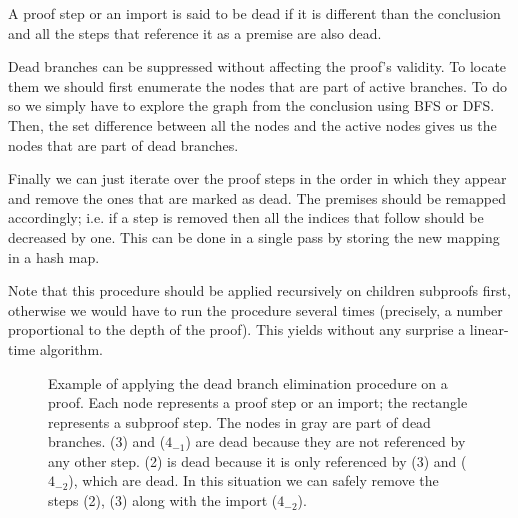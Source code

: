 \begin{definition}
A proof step or an import is said to be dead if it is different than the conclusion and all the steps that reference it as a premise are also dead.
\end{definition}

Dead branches can be suppressed without affecting the proof's validity. To locate them we should first enumerate the nodes that are part of active branches. To do so we simply have to explore the graph from the conclusion using BFS or DFS. Then, the set difference between all the nodes and the active nodes gives us the nodes that are part of dead branches.

Finally we can just iterate over the proof steps in the order in which they appear and remove the ones that are marked as dead. The premises should be remapped accordingly; i.e. if a step is removed then all the indices that follow should be decreased by one. This can be done in a single pass by storing the new mapping in a hash map.

Note that this procedure should be applied recursively on children subproofs first, otherwise we would have to run the procedure several times (precisely, a number proportional to the depth of the proof). This yields without any surprise a linear-time algorithm.

\begin{figure}[H]
  \centering
  \caption[Dead branch elimination]{Example of applying the dead branch elimination procedure on a proof. Each node represents a proof step or an import; the rectangle represents a subproof step. The nodes in gray are part of dead branches. (3) and ($4_{-1}$) are dead because they are not referenced by any other step. (2) is dead because it is only referenced by (3) and ($4_{-2}$), which are dead. In this situation we can safely remove the steps (2), (3) along with the import ($4_{-2}$).}
  \label{fig:synthesis-dead-branches}
\end{figure}

